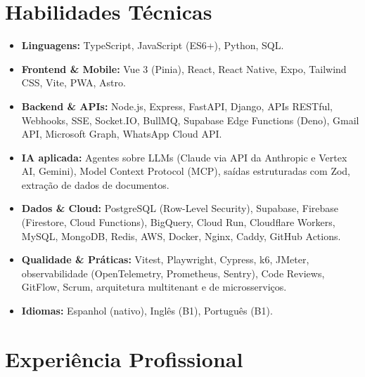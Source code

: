 \documentclass[11pt,a4paper]{article}
\begin{document}
\section*{Habilidades Técnicas}
\begin{itemize}[leftmargin=*, noitemsep]
    \item \textbf{Linguagens:} TypeScript, JavaScript (ES6+), Python, SQL.
    \item \textbf{Frontend \& Mobile:} Vue 3 (Pinia), React, React Native, Expo, Tailwind CSS, Vite, PWA, Astro.
    \item \textbf{Backend \& APIs:} Node.js, Express, FastAPI, Django, APIs RESTful, Webhooks, SSE, Socket.IO, BullMQ, Supabase Edge Functions (Deno), Gmail API, Microsoft Graph, WhatsApp Cloud API.
    \item \textbf{IA aplicada:} Agentes sobre LLMs (Claude via API da Anthropic e Vertex AI, Gemini), Model Context Protocol (MCP), saídas estruturadas com Zod, extração de dados de documentos.
    \item \textbf{Dados \& Cloud:} PostgreSQL (Row-Level Security), Supabase, Firebase (Firestore, Cloud Functions), BigQuery, Cloud Run, Cloudflare Workers, MySQL, MongoDB, Redis, AWS, Docker, Nginx, Caddy, GitHub Actions.
    \item \textbf{Qualidade \& Práticas:} Vitest, Playwright, Cypress, k6, JMeter, observabilidade (OpenTelemetry, Prometheus, Sentry), Code Reviews, GitFlow, Scrum, arquitetura multitenant e de microsserviços.
    \item \textbf{Idiomas:} Espanhol (nativo), Inglês (B1), Português (B1).
\end{itemize}

\section*{Experiência Profissional}
\end{document}
